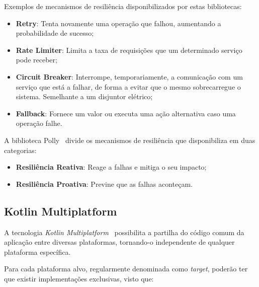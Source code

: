 Exemplos de mecanismos de resiliência disponibilizados por estas bibliotecas:

\begin{itemize}[topsep=0pt,itemsep=0pt,partopsep=0pt, parsep=0pt]
    \item \textbf{Retry}: Tenta novamente uma operação que falhou, aumentando a probabilidade de sucesso;
    \item \textbf{Rate Limiter}: Limita a taxa de requisições que um determinado serviço pode receber;
    \item \textbf{Circuit Breaker}: Interrompe, temporariamente, a comunicação com um serviço que está a falhar, de forma a evitar que o mesmo sobrecarregue o sistema. Semelhante a um disjuntor elétrico;
    \item \textbf{Fallback}: Fornece um valor ou executa uma ação alternativa caso uma operação falhe.
\end{itemize}

A biblioteca Polly~\cite{polly-dotnet} divide os mecanismos de resiliência que disponibiliza em duas categorias:

\begin{itemize}[topsep=0pt,itemsep=0pt,partopsep=0pt, parsep=0pt]
    \item \textbf{Resiliência Reativa}: Reage a falhas e mitiga o seu impacto;
    \item \textbf{Resiliência Proativa}: Previne que as falhas aconteçam.
\end{itemize}

\subsection{Kotlin Multiplatform}\label{subsec:kotlin-multiplatform}

A tecnologia \textit{Kotlin Multiplatform}~\cite{kmp} possibilita a partilha do código comum da aplicação entre diversas plataformas, tornando-o independente de qualquer plataforma específica.

Para cada plataforma alvo, regularmente denominada como \textit{target}, poderão ter que existir implementações exclusivas, visto que:


